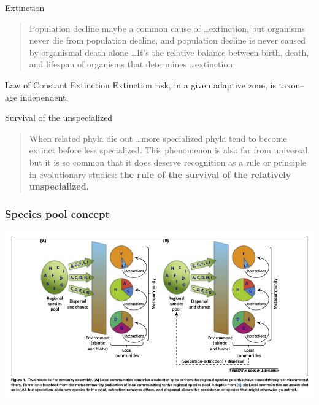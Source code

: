 \documentclass{beamer}
\begin{document}
\begin{frame}
  \begin{block}{Extinction}
    \begin{quote}
      Population decline maybe a common cause of \dots extinction, but organisms never die from population decline, and population decline is never caused by organismal death alone \dots It's the relative balance between birth, death, and lifespan of organisms that determines \dots extinction. 
    \end{quote}
  \end{block}

  \footnotesize{}
\end{frame}

\begin{frame}
  \begin{alertblock}{Law of Constant Extinction}
    Extinction risk, in a given adaptive zone, is taxon--age independent.
  \end{alertblock}

  \footnotesize{}
\end{frame}

\begin{frame}
  \begin{block}{Survival of the unspecialized}
    \begin{quote}
      When related phyla die out \dots more specialized phyla tend to become extinct before less specialized. This phenomenon is also far from universal, but it is so common that it does deserve recognition as a rule or principle in evolutionary studies: \textbf{the rule of the survival of the relatively unspecialized.}
    \end{quote}
  \end{block}

  \footnotesize{}
\end{frame}


\begin{frame}
  \frametitle{Species pool concept}

  \begin{center}
    \includegraphics[height=0.8\textheight,width=\textwidth,keepaspectratio=true]{figure/schemske_pool}
  \end{center}

\end{frame}
\end{document}

